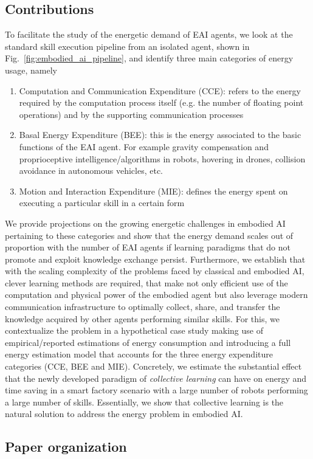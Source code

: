 \subsection{Contributions}
To facilitate the study of the energetic demand of EAI agents, we look at the standard skill execution pipeline from an isolated agent, shown in Fig.~\ref{fig:embodied_ai_pipeline}, and identify three main categories of energy usage, namely
\begin{enumerate}
    \item Computation and Communication Expenditure (CCE): refers to the energy required by the computation process itself (e.g. the number of floating point operations) and by the supporting communication processes
    \item Basal Energy Expenditure (BEE): this is the energy associated to the basic functions of the EAI agent. For example gravity compensation and proprioceptive intelligence/algorithms in robots, hovering in drones, collision avoidance in autonomous vehicles, etc.
    \item Motion and Interaction Expenditure (MIE): defines the energy spent on executing a particular skill in a certain form
\end{enumerate}
We provide projections on the growing energetic challenges in embodied AI pertaining to these categories and show that the energy demand scales out of proportion with the number of EAI agents if learning paradigms that do not promote and exploit knowledge exchange persist. Furthermore, we establish that with the scaling complexity of the problems faced by classical and embodied AI, clever learning methods are required, that make not only efficient use of the computation and physical power of the embodied agent but also leverage modern communication infrastructure to optimally collect, share, and transfer the knowledge acquired by other agents performing similar skills. %
For this, we contextualize the problem in a hypothetical case study  making use of empirical/reported estimations of energy consumption and introducing a full energy estimation model that accounts for the three energy expenditure categories (CCE, BEE and MIE). Concretely, we estimate the substantial effect that the newly developed  paradigm of \emph{collective learning} can have on energy and time saving in a smart factory scenario with a large number of robots performing a large number of skills. Essentially, we show that collective learning is the natural solution to address the energy problem in embodied AI.

\subsection{Paper organization}
\TODO